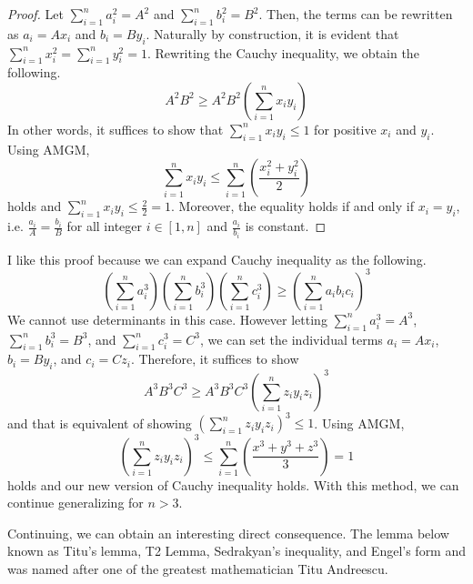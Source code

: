 \documentclass[../../main.tex]{subfiles}
\begin{document}
\begin{proof}
Let $\sum_{i=1}^n a_i^2 = A^2$ and $\sum_{i=1}^n b_i^2 = B^2$.
Then, the terms can be rewritten as $a_i = A x_i$ and $b_i = B y_i$.
Naturally by construction, it is evident that $\sum_{i=1}^n x_i^2
= \sum_{i=1}^n y_i^2 = 1$. Rewriting the Cauchy inequality,
we obtain the following.
\[
A^2 B^2
\geq A^2 B^2 \left( \sum_{i=1}^n x_i y_i \right)
\]
In other words, it suffices to show that $\sum_{i=1}^n x_i y_i
\leq 1$ for positive $x_i$ and $y_i$. Using AMGM,
\[
\sum_{i=1}^n x_i y_i
\leq \sum_{i=1}^n \left( \frac{x_i^2 + y_i^2}{2} \right)
\]
holds and $\sum_{i=1}^n x_i y_i \leq \frac{2}{2} = 1$. Moreover,
the equality holds if and only if $x_i = y_i$, i.e. $\frac{a_i}{A} =
\frac{b_i}{B}$ for all integer $i \in [1, n]$ and $\frac{a_i}{b_i}$
is constant.
\end{proof}

I like this proof because we can expand Cauchy inequality as
the following.
\[
\left( \sum_{i=1}^n a_i^3 \right) \left( \sum_{i=1}^n b_i^3 \right)
    \left( \sum_{i=1}^n c_i^3 \right)
\geq
\left( \sum_{i=1}^n a_i b_i c_i \right)^3
\]
We cannot use determinants in this case. However letting
$\sum_{i=1}^n a_i^3 = A^3$, $\sum_{i=1}^n b_i^3 = B^3$, and
$\sum_{i=1}^n c_i^3 = C^3$, we can set the individual terms
$a_i = Ax_i$, $b_i = By_i$, and $c_i = Cz_i$. Therefore,
it suffices to show
\[
A^3 B^3 C^3
\geq A^3 B^3 C^3 \left( \sum_{i=1}^n z_i y_i z_i \right)^3
\]
and that is equivalent of showing
$\left( \sum_{i=1}^n z_i y_i z_i \right)^3 \leq 1$. Using AMGM,
\[
\left( \sum_{i=1}^n z_i y_i z_i \right)^3
\leq \sum_{i=1}^n \left( \frac{x^3 + y^3 + z^3}{3} \right)
= 1
\]
holds and our new version of Cauchy inequality holds.
With this method, we can continue generalizing for $n > 3$.

Continuing, we can obtain an interesting direct consequence.
The lemma below known as Titu's lemma, T2 Lemma, Sedrakyan's
inequality, and Engel's form and was named after one of the
greatest mathematician Titu Andreescu.
\end{document}
